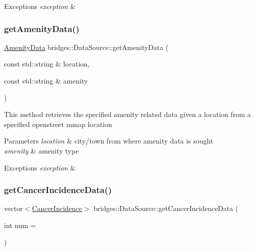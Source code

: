 \begin{DoxyExceptions}{Exceptions}
{\em exception} & \\
\hline
\end{DoxyExceptions}
\mbox{\label{classbridges_1_1_data_source_a457c6a6417de36ec36040cc2b7703cb2}} 
\subsubsection{\texorpdfstring{get\+Amenity\+Data()}{getAmenityData()}\hspace{0.1cm}{\footnotesize\ttfamily [2/2]}}
{\footnotesize\ttfamily \hyperlink{class_amenity_data}{Amenity\+Data} bridges\+::\+Data\+Source\+::get\+Amenity\+Data (\begin{DoxyParamCaption}\item[{const std\+::string \&}]{location,  }\item[{const std\+::string \&}]{amenity }\end{DoxyParamCaption})\hspace{0.3cm}{\ttfamily [inline]}}

This method retrieves the specified amenity related data given a location from a specified openstreet mmap location


\begin{DoxyParams}{Parameters}
{\em location} & city/town from where amenity data is sought \\
\hline
{\em amenity} & amenity type \\
\hline
\end{DoxyParams}

\begin{DoxyExceptions}{Exceptions}
{\em exception} & \\
\hline
\end{DoxyExceptions}
\mbox{\label{classbridges_1_1_data_source_a52d8161e7c093ab3615acea7085f6689}} 
\subsubsection{\texorpdfstring{get\+Cancer\+Incidence\+Data()}{getCancerIncidenceData()}}
{\footnotesize\ttfamily vector$<$\hyperlink{classbridges_1_1dataset_1_1_cancer_incidence}{Cancer\+Incidence}$>$ bridges\+::\+Data\+Source\+::get\+Cancer\+Incidence\+Data (\begin{DoxyParamCaption}\item[{int}]{num = {} }\end{DoxyParamCaption})\hspace{0.3cm}{\ttfamily [inline]}}



